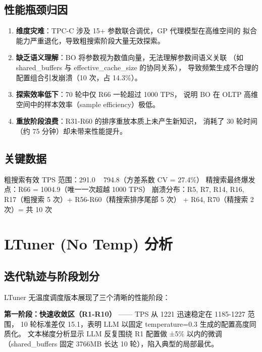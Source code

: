 \subsection{性能瓶颈归因}

\begin{enumerate}
  \item \textbf{维度灾难}：TPC-C 涉及 15+ 参数联合调优，GP 代理模型在高维空间的
        拟合能力严重退化，导致粗搜索阶段大量无效探索。
  \item \textbf{缺乏语义理解}：BO 将参数视为数值向量，无法理解参数间语义关联
       （如 shared\_buffers 与 effective\_cache\_size 的协同关系），
        导致频繁生成不合理的配置组合引发崩溃（10 次，占 14.3\%）。
  \item \textbf{探索效率低下}：70 轮中仅 R66 一轮超过 1000 TPS，
        说明 BO 在 OLTP 高维空间中的样本效率（sample efficiency）极低。
  \item \textbf{重放阶段浪费}：R31-R60 的排序重放本质上未产生新知识，
        消耗了 30 轮时间（约 75 分钟）却未带来性能提升。
\end{enumerate}

\subsection{关键数据}

粗搜索有效 TPS 范围：291.0 ~ 794.8（方差系数 CV = 27.4\%）
精搜索最终爆发点：R66 = 1004.9（唯一一次超越 1000 TPS）
崩溃分布：R5, R7, R14, R16, R17（粗搜索 5 次）+ R56-R60（精搜索排序尾部 5 次）
+ R64, R70（精搜索 2 次）= 共 10 次



\section{LTuner (No Temp) 分析}

\subsection{迭代轨迹与阶段划分}

LTuner 无温度调度版本展现了三个清晰的性能阶段：

\textbf{第一阶段：快速收敛区（R1-R10）} —— TPS 从 1221 迅速稳定在 1185-1227 范围，
10 轮标准差仅 15.1，表明 LLM 以固定 temperature=0.3 生成的配置高度同质化。
文本梯度分析显示 LLM 反复围绕 R1 配置做 ±5\% 以内的微调（shared\_buffers 固定
3766MB 长达 10 轮），陷入典型的局部最优。

